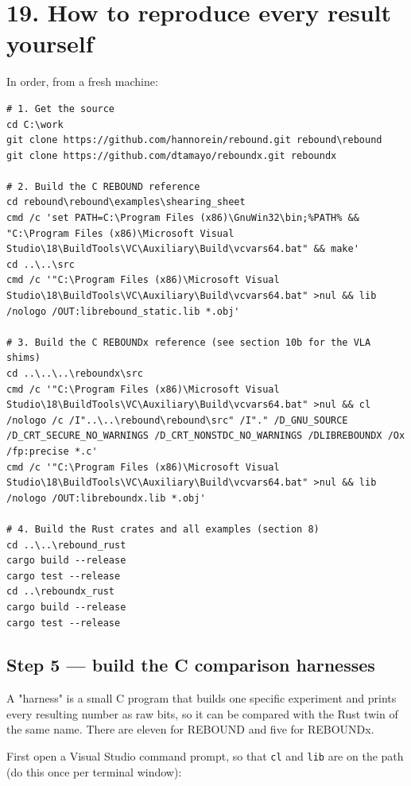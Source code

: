 \documentclass[11pt]{article}
\begin{document}
\section{19. How to reproduce every result yourself}

In order, from a fresh machine:

\begin{lstlisting}
# 1. Get the source
cd C:\work
git clone https://github.com/hannorein/rebound.git rebound\rebound
git clone https://github.com/dtamayo/reboundx.git reboundx

# 2. Build the C REBOUND reference
cd rebound\rebound\examples\shearing_sheet
cmd /c 'set PATH=C:\Program Files (x86)\GnuWin32\bin;%PATH% && "C:\Program Files (x86)\Microsoft Visual Studio\18\BuildTools\VC\Auxiliary\Build\vcvars64.bat" && make'
cd ..\..\src
cmd /c '"C:\Program Files (x86)\Microsoft Visual Studio\18\BuildTools\VC\Auxiliary\Build\vcvars64.bat" >nul && lib /nologo /OUT:librebound_static.lib *.obj'

# 3. Build the C REBOUNDx reference (see section 10b for the VLA shims)
cd ..\..\..\reboundx\src
cmd /c '"C:\Program Files (x86)\Microsoft Visual Studio\18\BuildTools\VC\Auxiliary\Build\vcvars64.bat" >nul && cl /nologo /c /I"..\..\rebound\rebound\src" /I"." /D_GNU_SOURCE /D_CRT_SECURE_NO_WARNINGS /D_CRT_NONSTDC_NO_WARNINGS /DLIBREBOUNDX /Ox /fp:precise *.c'
cmd /c '"C:\Program Files (x86)\Microsoft Visual Studio\18\BuildTools\VC\Auxiliary\Build\vcvars64.bat" >nul && lib /nologo /OUT:libreboundx.lib *.obj'

# 4. Build the Rust crates and all examples (section 8)
cd ..\..\rebound_rust
cargo build --release
cargo test --release
cd ..\reboundx_rust
cargo build --release
cargo test --release

\end{lstlisting}

\subsection{Step 5 --- build the C comparison harnesses}

A "harness" is a small C program that builds one specific experiment and prints every resulting number as raw bits, so it can be compared with the Rust twin of the same name. There are eleven for REBOUND and five for REBOUNDx.

First open a Visual Studio command prompt, so that \texttt{cl} and \texttt{lib} are on the path (do this once per terminal window):
\end{document}
